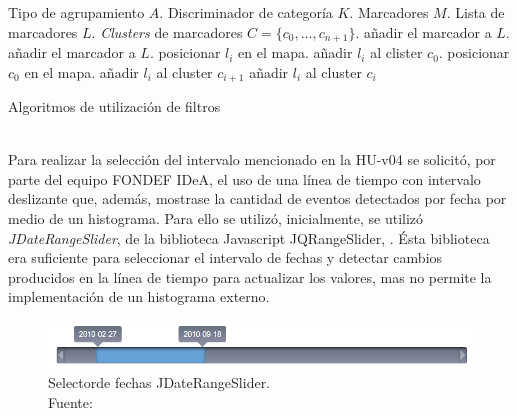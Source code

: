 \begin{algorithm}[!htb]
	\begin{algorithmic}
		\REQUIRE Tipo de agrupamiento $A$.
		\REQUIRE Discriminador de categoría $K$.
		\REQUIRE Marcadores $M$.
		\STATE Lista de marcadores $L$.
		\STATE \textit{Clusters} de marcadores $C = \{c_{0}, \dots, c_{n+1} \}$.
				\STATE añadir el marcador a $L$.
				\STATE añadir el marcador a $L$.
			\ENDIF
		\ENDFOR
				\STATE posicionar $l_{i}$ en el mapa.
			\ENDFOR
				\STATE añadir $l_{i}$ al clister $c_{0}$.
			\ENDFOR
			\STATE posicionar $c_{0}$ en el mapa.
		\ELSE
				\STATE añadir $l_{i}$ al cluster $c_{i+1}$
			\ENDFOR
				\STATE añadir $l_{i}$ al cluster $c_{i}$
			\ENDFOR
		\ENDIF
	\end{algorithmic}
	\caption{Algoritmos de utilización de filtros}
	\label{alg:filtroMarcadores}
\end{algorithm}\vphantom\\

Para realizar la selección del intervalo mencionado en la HU-v04 se solicitó, por parte del equipo FONDEF IDeA, el uso de una línea de tiempo con intervalo deslizante que, además, mostrase la cantidad de eventos detectados por fecha por medio de un histograma. Para ello se utilizó, inicialmente, se utilizó \textit{JDateRangeSlider}, de la biblioteca Javascript JQRangeSlider, \cite{JQRangeSlider}. Ésta biblioteca era suficiente para seleccionar el intervalo de fechas y detectar cambios producidos en la línea de tiempo para actualizar los valores, mas no permite la implementación de un histograma externo.

\begin{figure}[H]
	\centering
	\captionsetup{justification=centering}
	\includegraphics[scale=0.6]{images/JDateRangeSlider.png}
	\caption[Selectorde fechas JDateRangeSlider.]{Selectorde fechas JDateRangeSlider.\\Fuente: \cite{JQRangeSlider}}
	\label{fig:JQRangeSlider}
\end{figure}


